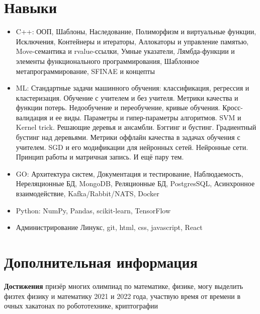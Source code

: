 \documentclass[a4paper,10pt]{article}
\begin{document}
\section*{Навыки}
\noindent
\begin{itemize}[noitemsep]
    \item C++: ООП, Шаблоны, Наследование, Полиморфизм и виртуальные функции, Исключения, Контейнеры и итераторы, Аллокаторы и управление памятью, Move-семантика и rvalue-ссылки, Умные указатели, Лямбда-функции и элементы функционального программирования, Шаблонное метапрограммирование, SFINAE и концепты
    \item ML: Стандартные задачи машинного обучения: классификация, регрессия и кластеризация. Обучение с учителем и без учителя. Метрики качества и функции потерь. Недообучение и переобучение, кривые обучения. Кросс-валидация и ее виды. Параметры и гипер-параметры алгоритмов.
    SVM и Kernel trick.
    Решающие деревья и ансамбли.
    Бэггинг и бустинг.
    Градиентный бустинг над деревьями.
    Метрики оффлайн качества в задачах обучения с учителем.
    SGD и его модификации для нейронных сетей.
    Нейронные сети. Принцип работы и матричная запись. 
    И ещё пару тем.
    \item GO: Архитектура систем, Документация и тестирование, Наблюдаемость, Нереляционные БД, MongoDB, Реляционные БД, PostgresSQL, Асинхронное взаимодействие, Kafka/Rabbit/NATS, Docker
    \item Python: NumPy, Pandas, scikit-learn, TensorFlow
    \item Администрирование Линукс, git, html, css, javascript, React
\end{itemize}

\section*{Дополнительная информация}
\noindent
\textbf{Достижения} призёр многих олимпиад по математике, физике, могу выделить физтех физику и математику 2021 и 2022 года, участвую время от времени в очных хакатонах по робототехнике, криптографии
\end{document}
